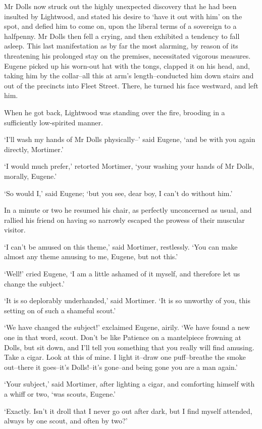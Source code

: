 Mr Dolls now struck out the highly unexpected discovery that he had been
insulted by Lightwood, and stated his desire to ‘have it out with him’
on the spot, and defied him to come on, upon the liberal terms of
a sovereign to a halfpenny. Mr Dolls then fell a crying, and then
exhibited a tendency to fall asleep. This last manifestation as by far
the most alarming, by reason of its threatening his prolonged stay
on the premises, necessitated vigorous measures. Eugene picked up his
worn-out hat with the tongs, clapped it on his head, and, taking him by
the collar--all this at arm’s length--conducted him down stairs and out
of the precincts into Fleet Street. There, he turned his face westward,
and left him.

When he got back, Lightwood was standing over the fire, brooding in a
sufficiently low-spirited manner.

‘I’ll wash my hands of Mr Dolls physically--’ said Eugene, ‘and be with
you again directly, Mortimer.’

‘I would much prefer,’ retorted Mortimer, ‘your washing your hands of Mr
Dolls, morally, Eugene.’

‘So would I,’ said Eugene; ‘but you see, dear boy, I can’t do without
him.’

In a minute or two he resumed his chair, as perfectly unconcerned as
usual, and rallied his friend on having so narrowly escaped the prowess
of their muscular visitor.

‘I can’t be amused on this theme,’ said Mortimer, restlessly. ‘You can
make almost any theme amusing to me, Eugene, but not this.’

‘Well!’ cried Eugene, ‘I am a little ashamed of it myself, and therefore
let us change the subject.’

‘It is so deplorably underhanded,’ said Mortimer. ‘It is so unworthy of
you, this setting on of such a shameful scout.’

‘We have changed the subject!’ exclaimed Eugene, airily. ‘We have found
a new one in that word, scout. Don’t be like Patience on a mantelpiece
frowning at Dolls, but sit down, and I’ll tell you something that you
really will find amusing. Take a cigar. Look at this of mine. I
light it--draw one puff--breathe the smoke out--there it goes--it’s
Dolls!--it’s gone--and being gone you are a man again.’

‘Your subject,’ said Mortimer, after lighting a cigar, and comforting
himself with a whiff or two, ‘was scouts, Eugene.’

‘Exactly. Isn’t it droll that I never go out after dark, but I find
myself attended, always by one scout, and often by two?’

